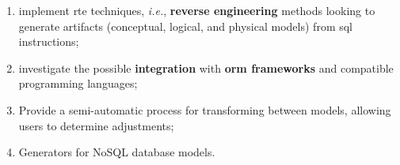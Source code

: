 \begin{enumerate} [label=\roman*.]
    \item implement \ac{rte} techniques, \textit{i.e.}, \textbf{reverse engineering} methods looking to generate artifacts (conceptual, logical, and physical models) from \ac{sql} instructions;
    \item investigate the possible \textbf{integration} with \textbf{\ac{orm} frameworks} and compatible programming languages;
    \item Provide a semi-automatic process for transforming between models, allowing users to determine adjustments;
    \item Generators for NoSQL database models.
\end{enumerate}










